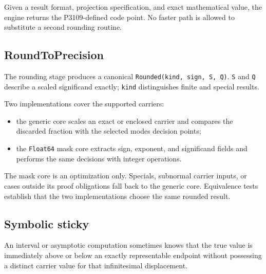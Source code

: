 \label{13186320241685802497}{}


Given a result format, projection specification, and exact mathematical value, the engine returns the P3109-defined code point. No faster path is allowed to substitute a second rounding routine.



\subsection{RoundToPrecision}



\label{12497502450802178048}{}


The rounding stage produces a canonical \texttt{Rounded(\allowbreak{}kind, sign, S, Q)}. \texttt{S} and \texttt{Q} describe a scaled significand exactly; \texttt{kind} distinguishes finite and special results.



Two implementations cover the supported carriers:



\begin{itemize}
\item the generic core scales an exact or enclosed carrier and compares the discarded fraction with the selected mode{\textquotesingle}s decision points;


\item the \texttt{Float64} mask core extracts sign, exponent, and significand fields and performs the same decisions with integer operations.

\end{itemize}


The mask core is an optimization only. Specials, subnormal carrier inputs, or cases outside its proof obligations fall back to the generic core. Equivalence tests establish that the two implementations choose the same rounded result.



\subsection{Symbolic sticky}



\label{2459250003184940128}{}


An interval or asymptotic computation sometimes knows that the true value is immediately above or below an exactly representable endpoint without possessing a distinct carrier value for that infinitesimal displacement.



